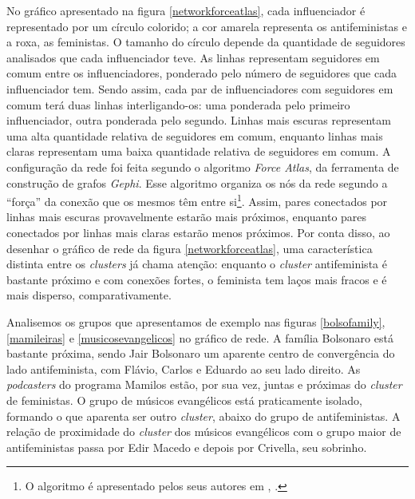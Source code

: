 \documentclass[
	12pt,				%
	openright,			%
	twoside,			%
	a4paper,			%
	english,			%
	brazil				%
	]{abntex2}
\begin{document}
 No gráfico apresentado na figura \ref{networkforceatlas}, cada influenciador é representado por um círculo colorido; a cor amarela representa os antifeministas e a roxa, as feministas. O tamanho do círculo depende da quantidade de seguidores analisados que cada influenciador teve. As linhas representam seguidores em comum entre os influenciadores, ponderado pelo número de seguidores que cada influenciador tem. Sendo assim, cada par de influenciadores com seguidores em comum terá duas linhas interligando-os: uma ponderada pelo primeiro influenciador, outra ponderada pelo segundo. Linhas mais escuras representam uma alta quantidade relativa de seguidores em comum, enquanto linhas mais claras representam uma baixa quantidade relativa de seguidores em comum. A configuração da rede foi feita segundo o algoritmo \textit{Force Atlas}, da ferramenta de construção de grafos \textit{Gephi}. Esse algoritmo organiza os nós da rede segundo a ``força'' da conexão que os mesmos têm entre si\footnote{O algoritmo é apresentado pelos seus autores em , \citeyear{forceatlas}.}. Assim, pares conectados por linhas mais escuras provavelmente estarão mais próximos, enquanto pares conectados por linhas mais claras estarão menos próximos. Por conta disso, ao desenhar o gráfico de rede da figura \ref{networkforceatlas}, uma característica distinta entre os \textit{clusters} já chama atenção: enquanto o \textit{cluster} antifeminista é bastante próximo e com conexões fortes, o feminista tem laços mais fracos e é mais disperso, comparativamente.

 Analisemos os grupos que apresentamos de exemplo nas figuras \ref{bolsofamily}, \ref{mamileiras} e \ref{musicosevangelicos} no gráfico de rede. A família Bolsonaro está bastante próxima, sendo Jair Bolsonaro um aparente centro de convergência do lado antifeminista, com Flávio, Carlos e Eduardo ao seu lado direito. As \textit{podcasters} do programa Mamilos estão, por sua vez, juntas e próximas do \textit{cluster} de feministas. O grupo de músicos evangélicos está praticamente isolado, formando o que aparenta ser outro \textit{cluster}, abaixo do grupo de antifeministas. A relação de proximidade do \textit{cluster} dos músicos evangélicos com o grupo maior de antifeministas passa por Edir Macedo e depois por Crivella, seu sobrinho.
 
\end{document}
